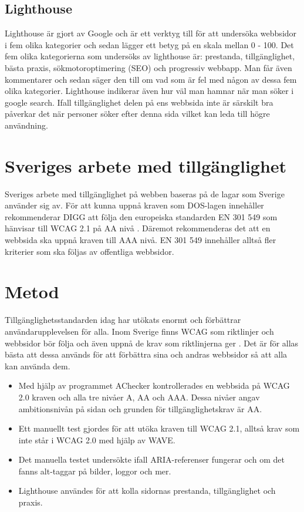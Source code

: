 \documentclass[11p]{article}
\begin{document}
    \subsection{Lighthouse}
    Lighthouse är gjort av Google och är ett verktyg till för att undersöka webbsidor i fem olika kategorier och sedan lägger ett betyg på en skala mellan 0 - 100.
    Det fem olika kategorierna som undersöks av lighthouse är: prestanda, tillgänglighet, bästa praxis, sökmotoroptimering (SEO) och progressiv webbapp.
    Man får även kommentarer och sedan säger den till om vad som är fel med någon av dessa fem olika kategorier.
    Lighthouse indikerar även hur väl man hamnar när man söker i google search.
    Ifall tillgänglighet delen på ens webbsida inte är särskilt bra påverkar det när personer söker efter denna sida vilket kan leda till högre användning.
    
    \section{Sveriges arbete med tillgänglighet}
    Sveriges arbete med tillgänglighet på webben baseras på de lagar som Sverige använder sig av.
    För att kunna uppnå kraven som DOS-lagen innehåller rekommenderar DIGG att följa den europeiska standarden EN 301 549 som hänvisar till WCAG 2.1 på AA nivå \textcite{Digg_Dos}.
    Däremot rekommenderas det att en webbsida ska uppnå kraven till AAA nivå.
    EN 301 549 innehåller alltså fler kriterier som ska följas av offentliga webbsidor.

    \section{Metod}
    Tillgänglighetsstandarden idag har utökats enormt och förbättrar användarupplevelsen för alla.
    Inom Sverige finns WCAG som riktlinjer och webbsidor bör följa och även uppnå de krav som riktlinjerna ger \textcite{Digg}.
    Det är för allas bästa att dessa används för att förbättra sina och andras webbsidor så att alla kan använda dem.

    \begin{itemize}
        \item Med hjälp av programmet AChecker kontrollerades en webbsida på WCAG 2.0 kraven och alla tre nivåer A, AA och AAA. Dessa nivåer angav ambitionsnivån på sidan och grunden för tillgänglighetskrav är AA.
        \item Ett manuellt test gjordes för att utöka kraven till WCAG 2.1, alltså krav som inte står i WCAG 2.0 med hjälp av WAVE.
        \item Det manuella testet undersökte ifall ARIA-referenser fungerar och om det fanns alt-taggar på bilder, loggor och mer.
        \item Lighthouse användes för att kolla sidornas prestanda, tillgänglighet och praxis.
    \end{itemize}
\end{document}
